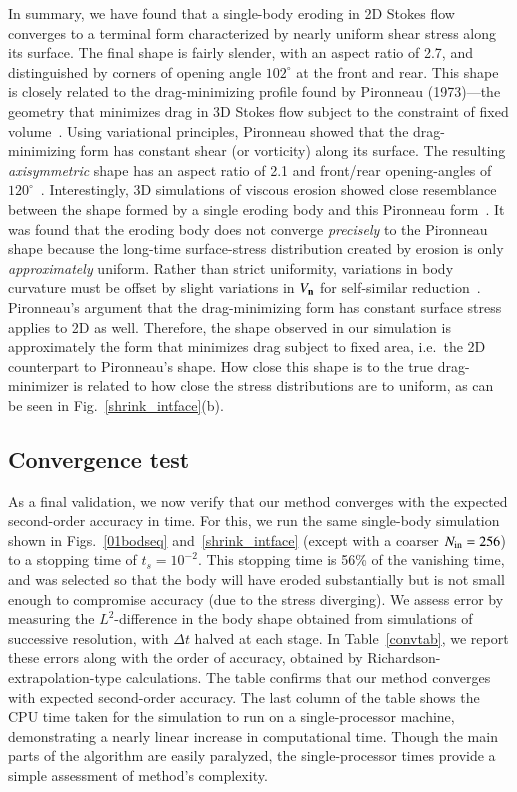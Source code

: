\documentclass[preprint, 10pt]{elsarticle}
\begin{document}
In summary, we have found that a single-body eroding in 2D Stokes flow converges to a terminal form characterized by nearly uniform shear stress along its surface. The final shape is fairly slender, with an aspect ratio of 2.7, and distinguished by  corners of opening angle $102^{\circ}$ at the front and rear. This shape is closely related to the drag-minimizing profile found by Pironneau (1973)---the geometry that minimizes drag in 3D Stokes flow subject to the constraint of fixed volume~\cite{pir1973}. Using variational principles, Pironneau showed that the drag-minimizing form has constant shear (or vorticity) along its surface. The resulting {\em axisymmetric} shape has an aspect ratio of 2.1 and front/rear opening-angles of $120^{\circ}$~\cite{pir1973, mit-spa2016}.  Interestingly, 3D simulations of viscous erosion showed close resemblance between the shape formed by a single eroding body and this Pironneau form~\cite{mit-spa2016}. It was found that the eroding body does not converge {\em precisely} to the Pironneau shape because the long-time surface-stress distribution created by erosion is only {\em approximately} uniform. Rather than strict uniformity, variations in body curvature must be offset by slight variations in $V_{\mathbf{n}}$ for self-similar reduction~\cite{pir1973, mit-spa2016}. Pironneau's argument that the drag-minimizing form has constant surface stress applies to 2D as well. Therefore, the shape observed in our simulation is approximately the form that minimizes drag subject to fixed area, i.e.~the 2D counterpart to Pironneau's shape. How close this shape is to the true drag-minimizer is related to how close the stress distributions are to uniform, as can be seen in Fig.~\ref{shrink_intface}(b).  

\subsection{Convergence test}
As a final validation, we now verify that our method converges with the expected second-order accuracy in time. For this, we run the same single-body simulation shown in Figs.~\ref{01bodseq} and~\ref{shrink_intface} (except with a coarser $N_{\mathrm{in}}=256$) to a stopping time of $t_s = 10^{-2}$. This stopping time is 56\% of the vanishing time, and was selected so that the body will have eroded substantially but is not small enough to compromise accuracy (due to the stress diverging).  We assess error by measuring the $L^2$-difference in the body shape obtained from simulations of successive resolution, with $\Delta t$ halved at each stage. In Table~\ref{convtab}, we report these errors along with the order of accuracy, obtained by Richardson-extrapolation-type calculations. The table confirms that our method converges with expected second-order accuracy. The last column of the table shows the CPU time taken for the simulation to run on a single-processor machine, demonstrating a nearly linear increase in computational time. Though the main parts of the algorithm are easily paralyzed, the single-processor times provide a simple assessment of method's complexity.
\end{document}
